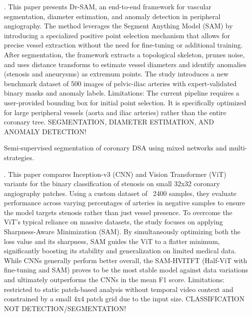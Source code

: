 \documentclass{article}
\begin{document}
\cite{zohranyan2024drsamendtoendframeworkvascular}. This paper presents Dr-SAM, an end-to-end framework for vascular segmentation, diameter estimation, and anomaly detection in peripheral angiography. The method leverages the Segment Anything Model (SAM) by introducing a specialized positive point selection mechanism that allows for precise vessel extraction without the need for fine-tuning or additional training. After segmentation, the framework extracts a topological skeleton, prunes noise, and uses distance transforms to estimate vessel diameters and identify anomalies (stenosis and aneurysms) as extremum points. The study introduces a new benchmark dataset of 500 images of pelvic-iliac arteries with expert-validated binary masks and anomaly labels. Limitations: The current pipeline requires a user-provided bounding box for initial point selection. It is specifically optimized for large peripheral vessels (aorta and iliac arteries) rather than the entire coronary tree. SEGMENTATION, DIAMETER ESTIMATION, AND ANOMALY DETECTION!




\cite{PU2023106493} Semi-supervised segmentation of coronary DSA using mixed networks and multi-strategies. 

\cite{JUNGIEWICZ2023120234}. This paper compares Inception-v3 (CNN) and Vision Transformer (ViT) variants for the binary classification of stenosis on small 32x32 coronary angiography patches. Using a custom dataset of ~2400 samples, they evaluate performance across varying percentages of arteries in negative samples to ensure the model targets stenosis rather than just vessel presence. To overcome the ViT's typical reliance on massive datasets, the study focuses on applying Sharpness-Aware Minimization (SAM). By simultaneously optimizing both the loss value and its sharpness, SAM guides the ViT to a flatter minimum, significantly boosting its stability and generalization on limited medical data. While CNNs generally perform better overall, the SAM-HVITFT (Half-ViT with fine-tuning and SAM) proves to be the most stable model against data variations and ultimately outperforms the CNNs in the mean F1 score. Limitations: restricted to static patch-based analysis without temporal video context and constrained by a small 4x4 patch grid due to the input size. CLASSIFICATION NOT DETECTION/SEGMENTATION!
\end{document}
